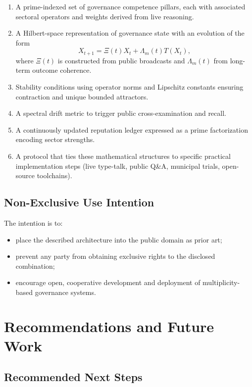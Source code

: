 \documentclass[11pt]{article}
\begin{document}
\begin{enumerate}[leftmargin=1.5em]
    \item A prime-indexed set of governance competence pillars, each with associated sectoral operators and weights derived from live reasoning.
    \item A Hilbert-space representation of governance state with an evolution of the form
    \[
      X_{t+1} = \Xi(t) X_t + \Lambda_m(t) T(X_t),
    \]
    where \(\Xi(t)\) is constructed from public broadcasts and \(\Lambda_m(t)\) from long-term outcome coherence.
    \item Stability conditions using operator norms and Lipschitz constants ensuring contraction and unique bounded attractors.
    \item A spectral drift metric to trigger public cross-examination and recall.
    \item A continuously updated reputation ledger expressed as a prime factorization encoding sector strengths.
    \item A protocol that ties these mathematical structures to specific practical implementation steps (live type-talk, public Q\&A, municipal trials, open-source toolchains).
\end{enumerate}

\subsection{Non-Exclusive Use Intention}

The intention is to:
\begin{itemize}[leftmargin=1.5em]
    \item place the described architecture into the public domain as prior art;
    \item prevent any party from obtaining exclusive rights to the disclosed combination;
    \item encourage open, cooperative development and deployment of multiplicity-based governance systems.
\end{itemize}

\section{Recommendations and Future Work}

\subsection{Recommended Next Steps}
\end{document}
